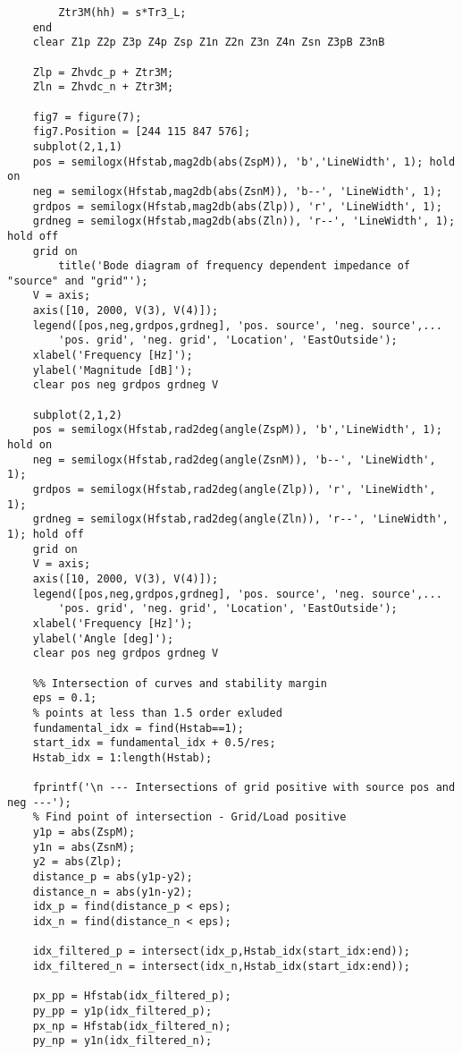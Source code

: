 \begin{appendices}
\begin{lstlisting}
        Ztr3M(hh) = s*Tr3_L;
    end
    clear Z1p Z2p Z3p Z4p Zsp Z1n Z2n Z3n Z4n Zsn Z3pB Z3nB
    
    Zlp = Zhvdc_p + Ztr3M;
    Zln = Zhvdc_n + Ztr3M;
    
    fig7 = figure(7);
    fig7.Position = [244 115 847 576];
    subplot(2,1,1)
    pos = semilogx(Hfstab,mag2db(abs(ZspM)), 'b','LineWidth', 1); hold on
    neg = semilogx(Hfstab,mag2db(abs(ZsnM)), 'b--', 'LineWidth', 1); 
    grdpos = semilogx(Hfstab,mag2db(abs(Zlp)), 'r', 'LineWidth', 1);
    grdneg = semilogx(Hfstab,mag2db(abs(Zln)), 'r--', 'LineWidth', 1); hold off
    grid on
        title('Bode diagram of frequency dependent impedance of "source" and "grid"');
    V = axis;
    axis([10, 2000, V(3), V(4)]);
    legend([pos,neg,grdpos,grdneg], 'pos. source', 'neg. source',...
        'pos. grid', 'neg. grid', 'Location', 'EastOutside');
    xlabel('Frequency [Hz]');
    ylabel('Magnitude [dB]');
    clear pos neg grdpos grdneg V
    
    subplot(2,1,2)
    pos = semilogx(Hfstab,rad2deg(angle(ZspM)), 'b','LineWidth', 1); hold on
    neg = semilogx(Hfstab,rad2deg(angle(ZsnM)), 'b--', 'LineWidth', 1); 
    grdpos = semilogx(Hfstab,rad2deg(angle(Zlp)), 'r', 'LineWidth', 1);
    grdneg = semilogx(Hfstab,rad2deg(angle(Zln)), 'r--', 'LineWidth', 1); hold off
    grid on
    V = axis;
    axis([10, 2000, V(3), V(4)]);
    legend([pos,neg,grdpos,grdneg], 'pos. source', 'neg. source',...
        'pos. grid', 'neg. grid', 'Location', 'EastOutside');
    xlabel('Frequency [Hz]');
    ylabel('Angle [deg]');
    clear pos neg grdpos grdneg V
    
    %% Intersection of curves and stability margin
    eps = 0.1;
    % points at less than 1.5 order exluded
    fundamental_idx = find(Hstab==1);
    start_idx = fundamental_idx + 0.5/res;
    Hstab_idx = 1:length(Hstab);
    
    fprintf('\n --- Intersections of grid positive with source pos and neg ---');
    % Find point of intersection - Grid/Load positive
    y1p = abs(ZspM);
    y1n = abs(ZsnM);
    y2 = abs(Zlp);
    distance_p = abs(y1p-y2);
    distance_n = abs(y1n-y2);
    idx_p = find(distance_p < eps);
    idx_n = find(distance_n < eps);
    
    idx_filtered_p = intersect(idx_p,Hstab_idx(start_idx:end));
    idx_filtered_n = intersect(idx_n,Hstab_idx(start_idx:end));
    
    px_pp = Hfstab(idx_filtered_p);
    py_pp = y1p(idx_filtered_p);
    px_np = Hfstab(idx_filtered_n);
    py_np = y1n(idx_filtered_n);
    

\end{lstlisting}
\end{appendices}
